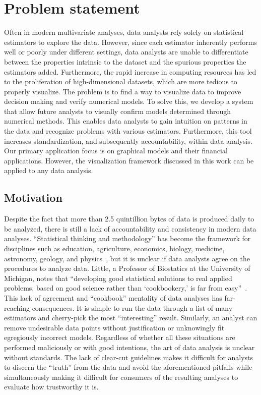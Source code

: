 \section{Problem statement}
\label{sec:intro:problem}

Often in modern multivariate analyses, data analysts rely solely on statistical estimators to explore the data. However, since each estimator inherently performs well or poorly under different settings, data analysts are unable to differentiate between the properties intrinsic to the dataset and the spurious properties the estimators added. Furthermore, the rapid increase in computing resources has led to the proliferation of high-dimensional datasets, which are more tedious to properly visualize. The problem is to find a way to visualize data to improve decision making and verify numerical models. To solve this, we develop a system that allow future analysts to visually confirm models determined through numerical methods. This enables data analysts to gain intuition on patterns in the data and recognize problems with various estimators. Furthermore, this tool increases standardization, and subsequently accountability, within data analysis. Our primary application focus is on graphical models and their financial applications. However, the visualization framework discussed in this work can be applied to any data analysis.

\subsection{Motivation}
\label{sec:intro:problem:motivation}

Despite the fact that more than 2.5 quintillion bytes of data is produced daily to be analyzed, there is still a lack of accountability and consistency in modern data analyses. ``Statistical thinking and methodology'' has become the framework for disciplines such as education, agriculture, economics, biology, medicine, astronomy, geology, and physics~\cite{efron1986}, but it is unclear if data analysts agree on the procedures to analyze data. Little, a Professor of Biostatics at the University of Michigan, notes that ``developing good statistical solutions to real applied problems, based on good science rather than `cookbookery,' is far from easy''~\cite{little2013}. This lack of agreement and ``cookbook'' mentality of data analyses has far-reaching consequences. It is simple to run the data through a list of many estimators and cherry-pick the most ``interesting'' result. Similarly, an analyst can remove undesirable data points without justification or unknowingly fit egregiously incorrect models. Regardless of whether all these situations are performed maliciously or with good intentions, the art of data analysis is unclear without standards. The lack of clear-cut guidelines makes it difficult for analysts to discern the ``truth'' from the data and avoid the aforementioned pitfalls while simultaneously making it difficult for consumers of the resulting analyses to evaluate how trustworthy it is. 


